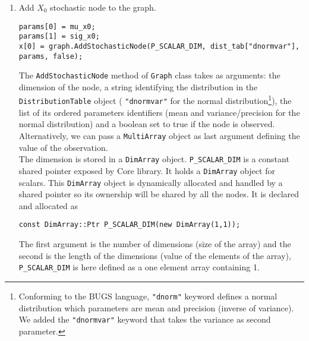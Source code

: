 \begin{enumerate}
\item Add $X_0$ stochastic node to the graph.
\begin{lstlisting}
params[0] = mu_x0;
params[1] = sig_x0;
x[0] = graph.AddStochasticNode(P_SCALAR_DIM, dist_tab["dnormvar"], params, false);
\end{lstlisting}                                                                                                                                                                                                                                                                                                                                                                                                                                                                                                                                                                                                                                                                                                                                                                      
The \texttt{AddStochasticNode} method of \texttt{Graph} class takes as arguments: the dimension of the node, a string identifying the distribution in the \texttt{DistributionTable} object (\eg{} \verb="dnormvar"= for the normal distribution\footnote{Conforming to the BUGS language, \texttt{"dnorm"} keyword defines a normal distribution which parameters are mean and precision (inverse of variance). We added the \texttt{"dnormvar"} keyword that takes the variance as second parameter.}), the list of its ordered parameters identifiers (mean and variance/precision for the normal distribution) and a boolean set to true if the node is observed. Alternatively, we can pass a \texttt{MultiArray} object as last argument defining the value of the observation.\\
The dimension is stored in a \texttt{DimArray} object. \verb=P_SCALAR_DIM= is a constant shared pointer exposed by \biips Core library. It holds a \texttt{DimArray} object for scalars. This \texttt{DimArray} object is dynamically allocated and handled by a shared pointer so its ownership will be shared by all the nodes. It is declared and allocated as
\begin{lstlisting}
const DimArray::Ptr P_SCALAR_DIM(new DimArray(1,1));
\end{lstlisting}
The first argument is the number of dimensions (size of the array) and the second is the length of the dimensions (value of the elements of the array), \ie{} \verb=P_SCALAR_DIM= is here defined as a one element array containing 1.


\end{enumerate}
